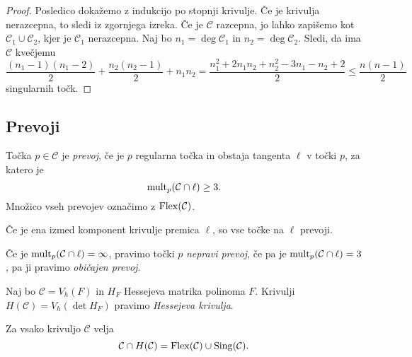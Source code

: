 \begin{proof}
Posledico dokažemo z indukcijo po stopnji krivulje. Če je krivulja
nerazcepna, to sledi iz zgornjega izreka. Če je $\mathcal{C}$
razcepna, jo lahko zapišemo kot $\mathcal{C}_1 \cup \mathcal{C}_2$,
kjer je $\mathcal{C}_1$ nerazcepna. Naj bo
$n_1 = \deg \mathcal{C}_1$ in $n_2 = \deg \mathcal{C}_2$. Sledi, da
ima $\mathcal{C}$ kvečjemu
\[
\frac{(n_1-1)(n_1-2)}{2} + \frac{n_2 (n_2-1)}{2} + n_1 n_2 =
\frac{n_1^2 + 2n_1n_2 + n_2^2 - 3n_1 - n_2 + 2}{2} \leq
\frac{n (n-1)}{2}
\]
singularnih točk.
\end{proof}

\newpage

\subsection{Prevoji}

\begin{definicija}
Točka $p \in \mathcal{C}$ je \emph{prevoj}, če
je $p$ regularna točka in obstaja tangenta $\ell$ v točki $p$, za
katero je
\[
\operatorname{mult}_p(\mathcal{C} \cap \ell) \geq 3.
\]
Množico vseh prevojev označimo z $\operatorname{Flex}(\mathcal{C})$.
\end{definicija}

\begin{opomba}
Če je ena izmed komponent krivulje premica $\ell$, so vse točke na
$\ell$ prevoji.
\end{opomba}

\begin{definicija}
Če je $\operatorname{mult}_p(\mathcal{C} \cap \ell) = \infty$, pravimo točki $p$
\emph{nepravi prevoj}, če pa je
$\operatorname{mult}_p(\mathcal{C} \cap \ell) = 3$, pa ji pravimo \emph{običajen
prevoj}.
\end{definicija}

\begin{definicija}
Naj bo $\mathcal{C} = V_h(F)$ in $H_F$ Hessejeva matrika polinoma
$F$. Krivulji $H(\mathcal{C}) = V_h(\det H_F)$ pravimo
\emph{Hessejeva krivulja}.
\end{definicija}

\begin{izrek}
Za vsako krivuljo $\mathcal{C}$ velja
\[
\mathcal{C} \cap H(\mathcal{C}) =
\operatorname{Flex}(\mathcal{C}) \cup \operatorname{Sing}(\mathcal{C}).
\]
\end{izrek}

